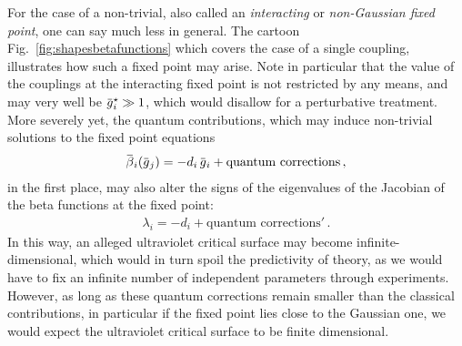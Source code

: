 \documentclass[11pt]{book}
\newcommand{\overbar}[1]{\mkern 1.5mu\overline{\mkern-1.5mu#1\mkern-1.5mu}\mkern 1.5mu}
\numberwithin{equation}{chapter}
\begin{document}
For the case of a non-trivial, also called
an \textit{interacting} or \textit{non-Gaussian fixed point},
one can say much less in general.
The cartoon Fig.~\ref{fig:shapesbetafunctions} which
covers the case of a single coupling,
illustrates how such a fixed point may arise.
Note in particular
that the value of the couplings at the
interacting fixed point
is not restricted by any means, and may very well
be $\overbar g_i^\star \gg 1$,
which would disallow for a perturbative treatment.
More severely yet, the quantum contributions,
which may induce non-trivial solutions to the fixed point
equations
\begin{align}
  \overbar \beta_i(\overbar g_j) =
  - d_i \, \overbar g_i +
  \text{quantum corrections} \,,
\end{align}
in the first place,
may also alter the signs of the eigenvalues of the Jacobian
of the beta functions at the fixed point:
\begin{align}
  \lambda_i =
  - d_i +
  \text{quantum corrections}' \,.
\end{align}
In this way,
an alleged ultraviolet critical surface
may become infinite-dimensional, which would in turn spoil
the predictivity of theory, as we would have to fix
an infinite number of independent parameters through
experiments.
However, as long as these quantum corrections remain smaller
than the classical contributions, in particular
if the fixed point lies close to the Gaussian one, we
would expect the ultraviolet critical surface to be finite
dimensional.
\end{document}

